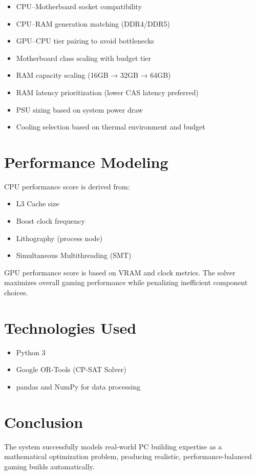 \documentclass[11pt,a4paper]{article}
\begin{document}
\begin{itemize}[noitemsep]
    \item CPU–Motherboard socket compatibility
    \item CPU–RAM generation matching (DDR4/DDR5)
    \item GPU–CPU tier pairing to avoid bottlenecks
    \item Motherboard class scaling with budget tier
    \item RAM capacity scaling (16GB → 32GB → 64GB)
    \item RAM latency prioritization (lower CAS latency preferred)
    \item PSU sizing based on system power draw
    \item Cooling selection based on thermal environment and budget
\end{itemize}

\section*{Performance Modeling}

CPU performance score is derived from:
\begin{itemize}[noitemsep]
    \item L3 Cache size
    \item Boost clock frequency
    \item Lithography (process node)
    \item Simultaneous Multithreading (SMT)
\end{itemize}

GPU performance score is based on VRAM and clock metrics. The solver maximizes overall gaming performance while penalizing inefficient component choices.

\section*{Technologies Used}

\begin{itemize}[noitemsep]
    \item Python 3
    \item Google OR-Tools (CP-SAT Solver)
    \item pandas and NumPy for data processing
\end{itemize}

\section*{Conclusion}

The system successfully models real-world PC building expertise as a mathematical optimization problem, producing realistic, performance-balanced gaming builds automatically.
\end{document}

